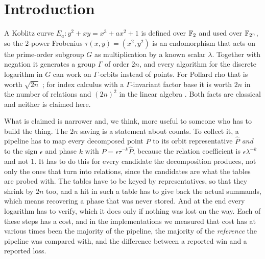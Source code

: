 \section{Introduction}
\label{sec:intro}

A Koblitz curve $E_a:y^2+xy=x^3+ax^2+1$ is defined over $\mathbb{F}_2$ and used
over $\mathbb{F}_{2^n}$, so the $2$-power Frobenius $\tau(x,y)=(x^2,y^2)$ is an
endomorphism that acts on the prime-order subgroup $G$ as
multiplication by a known scalar $\lambda$. Together with negation it
generates a group $\Gamma$ of order $2n$, and every algorithm for the
discrete logarithm in $G$ can work on $\Gamma$-orbits instead of
points. For Pollard rho that is worth $\sqrt{2n}$
\citep{wienerzuccherato1998,glv2001}; for index calculus with a
$\Gamma$-invariant factor base it is worth $2n$ in the number of
relations and $(2n)^2$ in the linear algebra
\citep{ggmp2020}. Both facts are classical and neither is claimed
here.

What is claimed is narrower and, we think, more useful to someone who
has to build the thing. The $2n$ saving is a statement about counts.
To collect it, a pipeline has to map every decomposed point $P$ to its
orbit representative $\hat P$ \emph{and} to the sign $\epsilon$ and
phase $k$ with $P=\epsilon\tau^{-k}\hat P$, because the relation
coefficient is $\epsilon\lambda^{-k}$ and not $1$. It has to do this
for every candidate the decomposition produces, not only the ones that
turn into relations, since the candidates are what the tables are
probed with. The tables have to be keyed by representatives, so that
they shrink by $2n$ too, and a hit in such a table has to give back
the actual summands, which means recovering a phase that was never
stored. And at the end every logarithm has to verify, which it does
only if nothing was lost on the way. Each of these steps has a cost,
and in the implementations we measured that cost has at various times
been the majority of the pipeline, the majority of the \emph{reference}
the pipeline was compared with, and the difference between a reported
win and a reported loss.

